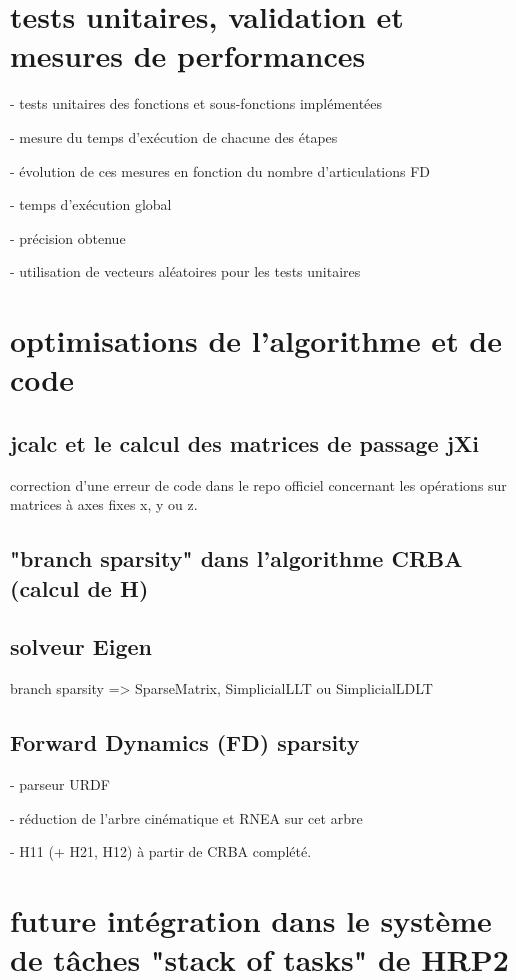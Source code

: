 \documentclass{report}
\begin{document}
\section{tests unitaires, validation et mesures de performances}

- tests unitaires des fonctions et sous-fonctions implémentées

- mesure du temps d'exécution de chacune des étapes

- évolution de ces mesures en fonction du nombre d'articulations FD

- temps d'exécution global

- précision obtenue

- utilisation de vecteurs aléatoires pour les tests unitaires


\section{optimisations de l'algorithme et de code} \label{ch_impl_optimisation}

\subsection{jcalc et le calcul des matrices de passage jXi}
correction d'une erreur de code dans le repo officiel concernant les opérations sur matrices à axes fixes x, y ou z.

\subsection{"branch sparsity" dans l'algorithme CRBA (calcul de H)}

\subsection{solveur Eigen}
branch sparsity => SparseMatrix, SimplicialLLT ou SimplicialLDLT

\subsection{Forward Dynamics (FD) sparsity}
- parseur URDF

- réduction de l'arbre cinématique et RNEA sur cet arbre

- H11 (+ H21, H12) à partir de CRBA complété.



\section{future intégration dans le système de tâches "stack of tasks" de HRP2}
\end{document}
